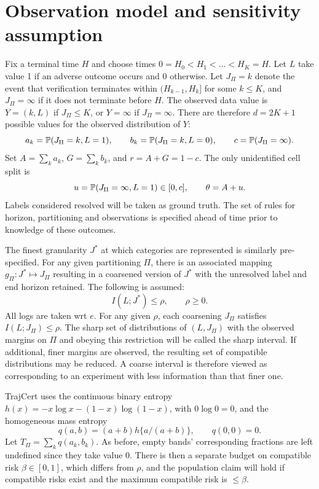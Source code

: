 \section{Observation model and sensitivity assumption}\label{sec:model}
Fix a terminal time $H$ and choose times $0=H_0<H_1<\ldots<H_K=H$. Let $L$ take value 1 if an adverse outcome occurs and 0 otherwise. Let $J_\Pi=k$ denote the event that verification terminates within $(H_{k-1},H_k]$ for some $k\le K$, and $J_\Pi=\infty$ if it does not terminate before $H$. The observed data value is $Y=(k,L)$ if $J_\Pi\le K$, or $Y=\infty$ if $J_\Pi=\infty$. There are therefore $d=2K+1$ possible values for the observed distribution of $Y$:
\begin{equation}\label{eq:masses}
 a_k=\mathbb P(J_\Pi=k,L=1),\qquad b_k=\mathbb P(J_\Pi=k,L=0),\qquad c=\mathbb P(J_\Pi=\infty).
\end{equation}
Set $A=\sum_k a_k$, $G=\sum_k b_k$, and $r=A+G=1-c$. The only unidentified cell split is
\begin{equation}\label{eq:hidden}
 u=\mathbb P(J_\Pi=\infty,L=1)\in[0,c],\qquad \theta=A+u.
\end{equation}
Labels considered resolved will be taken as ground truth. The set of rules for horizon, partitioning and observations is specified ahead of time prior to knowledge of these outcomes.

The finest granularity $J^*$ at which categories are represented is similarly pre-specified. For any given partitioning $\Pi$, there is an associated mapping $g_\Pi: J^* \mapsto J_\Pi$ resulting in a coarsened version of $J^*$ with the unresolved label and end horizon retained. The following is assumed: 
\begin{equation}\label{eq:pis}
 I(L;J^*)\le\rho,\qquad \rho\ge0.
\end{equation}
All logs are taken wrt $e$. For any given $\rho$, each coarsening $J_\Pi$ satisfies $I(L;J_\Pi) \leq \rho$. The sharp set of distributions of $(L, J_\Pi)$ with the observed margins on $\Pi$ and obeying this restriction will be called the sharp interval. If additional, finer margins are observed, the resulting set of compatible distributions may be reduced. A coarse interval is therefore viewed as corresponding to an experiment with less information than that finer one.

TrajCert uses the continuous binary entropy $h(x)=-x\log x-(1-x)\log(1-x)$, with $0\log0=0$, and the homogeneous mass entropy
\begin{equation}\label{eq:massentropy}
 q(a,b)=(a+b)h\{a/(a+b)\},\qquad q(0,0)=0.
\end{equation}
Let $T_\Pi=\sum_k q(a_k,b_k)$. As before, empty bands' corresponding fractions are left undefined since they take value 0. There is then a separate budget on compatible risk $\beta \in [0,1]$, which differs from $\rho$, and the population claim will hold if compatible risks exist and the maximum compatible risk is $\le \beta$.

